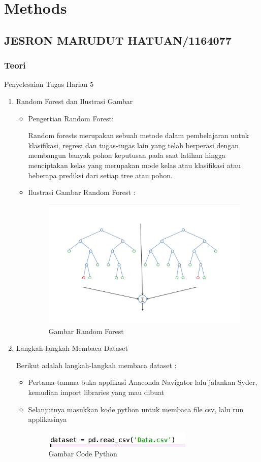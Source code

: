 \chapter{Methods}

\section{JESRON MARUDUT HATUAN/1164077}
\subsection{Teori}
Penyelesaian Tugas Harian 5
\begin{enumerate}
\item Random Forest dan Ilustrasi Gambar
\begin{itemize}
\item Pengertian Random Forest:

Random forests merupakan sebuah metode dalam pembelajaran untuk klasifikasi, regresi dan tugas-tugas lain yang telah berperasi dengan membangun banyak pohon keputusan pada saat latihan hingga menciptakan kelas yang merupakan mode kelas atau klasifikasi atau beberapa prediksi dari setiap tree atau pohon.

\item Ilustrasi Gambar Random Forest :
\begin{figure}[ht]
\centering
\includegraphics[scale=0.5]{figures/c3jesron1.png}
\caption{Gambar Random Forest}
\label{contoh}
\end{figure}
\end{itemize}
\item Langkah-langkah Membaca Dataset

Berikut adalah langkah-langkah membaca dataset :
\begin{itemize}
\item Pertama-tamma buka applikasi Anaconda Navigator lalu jalankan Syder, kemudian import libraries yang mau dibuat
\item Selanjutnya masukkan kode python untuk membaca file csv, lalu run applikasinya
\begin{figure}[ht]
\centering
\includegraphics[scale=0.8]{figures/c3jesron2.jpeg}
\caption{Gambar Code Python}
\label{contoh}
\end{figure}


\end{itemize}
\end{enumerate}
